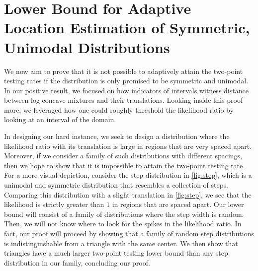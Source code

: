 \section{Lower Bound for Adaptive Location Estimation of Symmetric, Unimodal Distributions}

We now aim to prove that it is not possible to adaptively attain the two-point testing rates if the distribution is only promised to be symmetric and unimodal. In our positive result, we focused on how indicators of intervals witness distance between log-concave mixtures and their translations. Looking inside this proof more, we leveraged how one could roughly threshold the likelihood ratio by looking at an interval of the domain.

In designing our hard instance, we seek to design a distribution where the likelihood ratio with its translation is large in regions that are very spaced apart. Moreover, if we consider a family of such distributions with different spacings, then we hope to show that it is impossible to attain the two-point testing rate. For a more visual depiction, consider the step distribution in \cref{fig:step}, which is a unimodal and symmetric distribution that resembles a collection of steps. Comparing this distribution with a slight translation in \cref{fig:step}, we see that the likelihood is strictly greater than $1$ in regions that are spaced apart. Our lower bound will consist of a family of distributions where the step width is random. Then, we will not know where to look for the spikes in the likelihood ratio. In fact, our proof will proceed by showing that a family of random step distributions is indistinguishable from a triangle with the same center. We then show that triangles have a much larger two-point testing lower bound than any step distribution in our family, concluding our proof.

